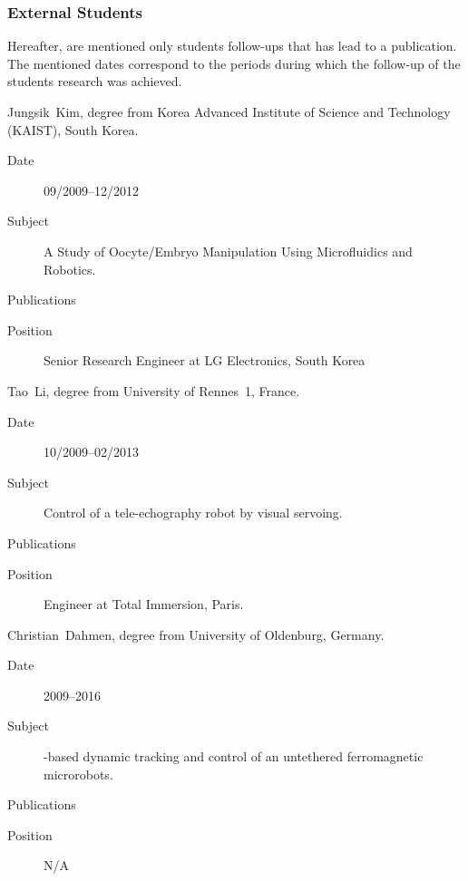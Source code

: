 \SkipAndBreak

\subsubsection{External Students}
Hereafter, are mentioned only students follow-ups that has lead to a publication.
The mentioned dates correspond to the periods during which the follow-up of the students research was achieved.

\begin{CVlist}[label={[EXT\arabic*]}]
  \item{}\textsf{Jungsik~Kim}, \PhD degree from Korea Advanced Institute of Science and Technology (KAIST), South Korea.
  \begin{description}
    \item[Date] 09/2009--12/2012 
    \item[Subject] A Study of Oocyte/Embryo Manipulation Using Microfluidics and Robotics.
    \item[Publications] \cite{2011_icra_kim,2012_tase_kim}
    \item[Position] Senior Research Engineer at LG Electronics, South Korea
  \end{description}
  
  \SkipAndBreak
  \item{}\textsf{Tao~Li}, \PhD degree from University of Rennes~1, France.
  \begin{description}
    \item[Date] 10/2009--02/2013 
    \item[Subject]Control of a tele-echography robot by visual servoing.
    \item[Publications] \cite{2014_isj_tao}
    \item[Position] Engineer at Total Immersion, Paris.
  \end{description}
  
  \SkipAndBreak
  \item{}\textsf{Christian~Dahmen}, \PhD degree from  University of Oldenburg, Germany.
  \begin{description}
    \item[Date] 2009--2016 
    \item[Subject]\MRI-based dynamic tracking and control of an untethered ferromagnetic microrobots.
    \item[Publications] \cite{2011_iros_folio,2012_iros_dahmen,2016_ijo_folio}
    \item[Position] N/A
  \end{description}
  \medskip
  

\end{CVlist}
